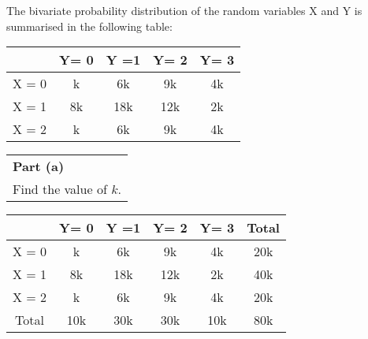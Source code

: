 \documentclass[a4paper,12pt]{article}
\begin{document}
	\begin{framed}
		\large 
		\noindent The bivariate probability distribution of the random variables X and Y is
		summarised in the following table:
		\large 
		\begin{center}
			\begin{tabular}{|c|c|c|c|c|} \hline 
				&  Y= 0 & Y =1 & Y= 2 & Y= 3\\ \hline 
				X = 0 & k & 6k & 9k & 4k \\ \hline 
				X = 1 & 8k & 18k & 12k & 2k \\ \hline 
				X = 2 & k & 6k & 9k & 4k \\ \hline 
			\end{tabular}
		\end{center}
	\end{framed}
	
	
	
	\begin{table}[ht!]
		\centering
		\begin{tabular}{|p{15cm}|}
			\hline  \large
			\noindent \textbf{Part (a)} \\ \large
			Find the value of $k$.
			\\ \hline
		\end{tabular}
	\end{table}
	
	
	
	\begin{center}
		\large 
		\begin{tabular}{|c||c|c|c|c||c|} \hline
			&  Y= 0 & Y =1 & Y= 2 & Y= 3 & Total\\ \hline 
			X = 0 & k & 6k & 9k & 4k & 20k\\ \hline 
			X = 1 & 8k & 18k & 12k & 2k & 40k\\ \hline 
			X = 2 & k & 6k & 9k & 4k &  20k\\ \hline  \hline
			Total & 10k  &30k & 30k & 10k &80k \\ \hline 
		\end{tabular}
	\end{center}
	\large
	
\end{document}
